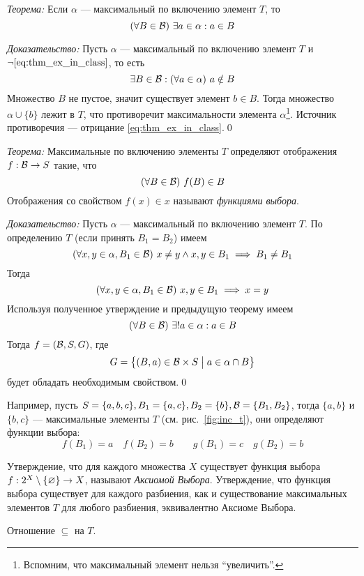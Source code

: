\vspace{1em}
{\it Теорема:} Если $\alpha$ --- максимальный по включению элемент $T$, то
\begin{equation}\label{eq:thm_ex_in_class}
  (\forall B\in\mathcal B)~\exists a\in\alpha:a\in B
\end{equation}

{\it Доказательство:}
Пусть $\alpha$ --- максимальный по включению элемент $T$ и
$\lnot\eqref{eq:thm_ex_in_class}$, то есть
\[
  \exists B\in\mathcal B:(\forall a\in\alpha)~a\notin B
\]
Множество $B$ не пустое, значит существует элемент $b\in B$.
Тогда множество $\alpha\cup \{b\}$ лежит в $T$, что противоречит
максимальности элемента $\alpha$\footnote{Вспомним, что максимальный элемент
  нельзя ``увеличить''.}.
Источник противоречия --- отрицание \eqref{eq:thm_ex_in_class}.\qed

\vspace{1em}
{\it Теорема:} Максимальные по включению элементы $T$ определяют
отображения $f:\mathcal B\to S$ такие, что
\[
  (\forall B\in\mathcal B)~f(B)\in B
\]
Отображения со свойством $f(x)\in x$ называют {\it функциями выбора}.

{\it Доказательство:} Пусть $\alpha$ --- максимальный по включению
элемент $T$.
По определению $T$ (если принять $B_1=B_2$) имеем
\[
  (\forall x,y\in\alpha,B_1\in\mathcal B)~x\neq y\land x,y\in B_1\implies B_1\neq B_1
\]
Тогда
\[
  (\forall x,y\in\alpha,B_1\in\mathcal B)~x,y\in B_1\implies x=y
\]
Используя полученное утверждение и предыдущую теорему имеем
\[
  (\forall B\in\mathcal B)~\exists !a\in\alpha:a\in B
\]
Тогда $f=(\mathcal B,S,G)$, где
\[
  G=\left\{(B,a)\in \mathcal B\times S\;\big|\; a\in\alpha\cap B\right\}
\]
будет обладать необходимым свойством.\qed

Например, пусть ${S=\{a,b,c\}, B_1=\{a,c\}, B_2=\{b\},\mathcal B=\{B_1,B_2\}}$,
тогда $\{a,b\}$ и $\{b,c\}$ --- максимальные элементы $T$
(см. рис.~\ref{fig:inc_t}),
они определяют функции выбора:
\[
  f(B_1)=a\quad f(B_2)=b\qquad g(B_1)=c\quad g(B_2)=b
\]

Утверждение, что для каждого множества $X$ существует функция
выбора $f:2^{X}\setminus\{\varnothing\}\to X$,
называют {\it Аксиомой Выбора}.
Утверждение, что функция выбора существует для каждого разбиения,
как и существование максимальных элементов $T$ для любого
разбиения, эквивалентно Аксиоме Выбора.

\begin{marginfigure}[-9cm]
  \center

  \caption{Отношение $\subseteq$ на $T$.}\label{fig:inc_t}
\end{marginfigure}

